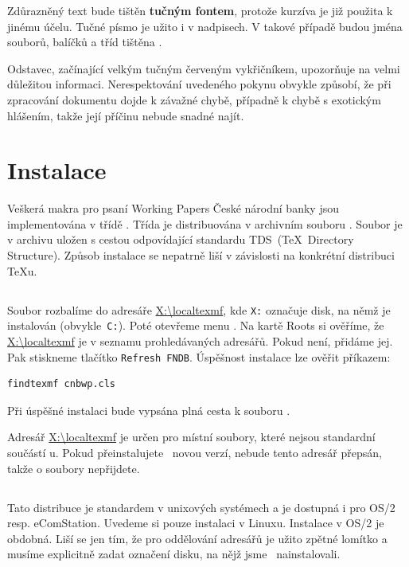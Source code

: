\documentclass[12pt]{article}
\begin{document}
Zdůrazněný text bude tištěn \textbf{tučným fontem}, protože kurzíva je již použita k jinému účelu.
Tučné písmo je užito i v nadpisech. V takové případě budou jména souborů, balíčků a tříd tištěna
\textbf{}.

\pozor Odstavec, začínající  velkým tučným červeným vykřičníkem, upozorňuje na velmi důležitou
informaci. Nerespektování uvedeného pokynu obvykle způsobí, že při zpracování dokumentu dojde k
závažné chybě, případně k chybě s exotickým hlášením, takže její příčinu nebude snadné najít.

\section{Instalace}\label{instalace}
Veškerá makra pro psaní Working Papers České národní banky jsou implementována v třídě
. Třída je distribuována v archivním souboru . Soubor je v archivu
uložen s cestou odpovídající standardu TDS~(\TeX\ Directory Structure). Způsob instalace se
nepatrně liší v závislosti na konkrétní distribuci \TeX{}u.

\subsection{\MikTeX}\label{inst.miktex}
Soubor  rozbalíme do adresáře \url{X:\localtexmf}, kde \texttt{X:} označuje disk, na
němž je \MikTeX{} instalován (obvykle~\texttt{C:}). Poté otevřeme menu
. Na kartě Roots si ověříme, že \url{X:\localtexmf} je
v seznamu prohledávaných adresářů. Pokud není, přidáme jej. Pak stiskneme tlačítko \texttt{Refresh
FNDB}. Úspěšnost instalace lze ověřit příkazem:

\begin{verbatim}
findtexmf cnbwp.cls
\end{verbatim}

\noindent Při úspěšné instalaci bude vypsána plná cesta k souboru .

\pozor Adresář \url{X:\localtexmf} je určen pro místní soubory, které nejsou standardní součástí
\MikTeX u. Pokud přeinstalujete \MikTeX\ novou verzí, nebude tento adresář přepsán, takže o soubory
nepřijdete.

\subsection{\teTeX}\label{inst.tetex}
Tato distribuce je standardem v unixových systémech a je dostupná i pro OS/2 resp. eComStation.
Uvedeme si pouze instalaci v Linuxu. Instalace v OS/2 je obdobná. Liší se jen tím, že pro
oddělování adresářů je užito zpětné lomítko a musíme explicitně zadat označení disku, na nějž jsme
\teTeX\ nainstalovali.
\end{document}
